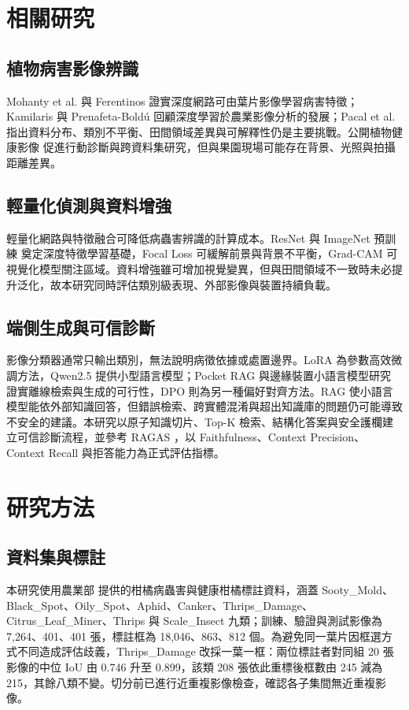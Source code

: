 \documentclass[10pt,twocolumn,a4paper]{article}
\begin{document}
\section{相關研究}
\subsection{植物病害影像辨識}
Mohanty et al. \cite{mohanty2016} 與 Ferentinos \cite{ferentinos2018} 證實深度網路可由葉片影像學習病害特徵；Kamilaris 與 Prenafeta-Boldú \cite{kamilaris2018} 回顧深度學習於農業影像分析的發展；Pacal et al. \cite{pacal2024} 指出資料分布、類別不平衡、田間領域差異與可解釋性仍是主要挑戰。公開植物健康影像\cite{hughes2015} 促進行動診斷與跨資料集研究，但與果園現場可能存在背景、光照與拍攝距離差異。

\subsection{輕量化偵測與資料增強}
輕量化網路與特徵融合可降低病蟲害辨識的計算成本\cite{guan2023,xiong2024,ashurov2025,xu2023,goyal2025,feng2025}。ResNet \cite{he2016} 與 ImageNet 預訓練\cite{deng2009} 奠定深度特徵學習基礎，Focal Loss \cite{lin2017} 可緩解前景與背景不平衡，Grad-CAM \cite{selvaraju2017} 可視覺化模型關注區域。資料增強雖可增加視覺變異，但與田間領域不一致時未必提升泛化\cite{shorten2019}，故本研究同時評估類別級表現、外部影像與裝置持續負載。

\subsection{端側生成與可信診斷}
影像分類器通常只輸出類別，無法說明病徵依據或處置邊界。LoRA \cite{hu2021} 為參數高效微調方法，Qwen2.5 \cite{qwen2025} 提供小型語言模型；Pocket RAG \cite{kang2026} 與邊緣裝置小語言模型研究\cite{guainazzo2026} 證實離線檢索與生成的可行性，DPO \cite{rafailov2023} 則為另一種偏好對齊方法。RAG 使小語言模型能依外部知識回答，但錯誤檢索、跨實體混淆與超出知識庫的問題仍可能導致不安全的建議。本研究以原子知識切片、Top-K 檢索、結構化答案與安全護欄建立可信診斷流程，並參考 RAGAS \cite{es2023}，以 Faithfulness、Context Precision、Context Recall 與拒答能力為正式評估指標。

\section{研究方法}
\subsection{資料集與標註}
本研究使用農業部\cite{moa2026} 提供的柑橘病蟲害與健康柑橘標註資料，涵蓋 Sooty\_Mold、Black\_Spot、Oily\_Spot、Aphid、Canker、Thrips\_Damage、Citrus\_Leaf\_Miner、Thrips 與 Scale\_Insect 九類；訓練、驗證與測試影像為 7,264、401、401 張，標註框為 18,046、863、812 個。為避免同一葉片因框選方式不同造成評估歧義，Thrips\_Damage 改採一葉一框：兩位標註者對同組 20 張影像的中位 IoU 由 0.746 升至 0.899，該類 208 張依此重標後框數由 245 減為 215，其餘八類不變。切分前已進行近重複影像檢查，確認各子集間無近重複影像。
\end{document}

